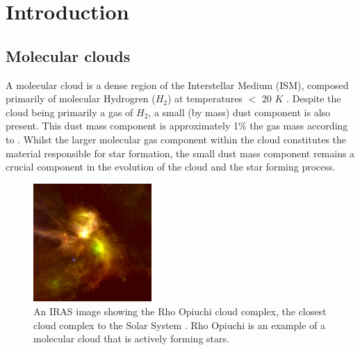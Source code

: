 \documentclass{report}
\begin{document}
\listoffigures

\listoftables


\chapter{Introduction}

\section{Molecular clouds}
A molecular cloud is a dense region of the Interstellar Medium (ISM), composed primarily of molecular Hydrogren ($H_{2}$) at temperatures $<$ 20 $K$ \parencite{dustopacity}. Despite the cloud being primarily a gas of $H_{2}$, a small (by mass) dust component is also present. This dust mass component is approximately 1\% the gas mass according to \textcite{noise}. Whilst the larger molecular gas component within the cloud constitutes the material responsible for star formation, the small dust mass component remains a crucial component in the evolution of the cloud and the star forming process.

\begin{figure}
  \begin{center}
    \includegraphics[width=0.4\textwidth]{../img/rho.jpg}
    \caption[An IRAS image showing the Rho Opiuchi cloud complex, the closest cloud complex to the Solar System \parencite{rho}. Rho Opiuchi is an example of a molecular cloud that is actively forming stars.]{An IRAS image showing the Rho Opiuchi cloud complex, the closest cloud complex to the Solar System \parencite{rho}. Rho Opiuchi is an example of a molecular cloud that is actively forming stars.}
  \end{center}
\end{figure} \label{fig:rho}
\end{document}
